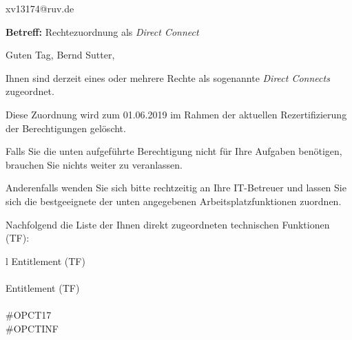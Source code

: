 \documentclass[a4paper,landscape,12pt]{letter}
\begin{document}
\begin{letter}{xv13174@ruv.de\hfill \break}
\begin{normalsize}
	\opening{\textbf{Betreff:} Rechtezuordnung als \emph{Direct Connect}}
	\begin{normalsize} \hfill
	\end{normalsize}

	\begin{normalsize}
		Guten Tag, 
	Bernd Sutter, \hfill \break
	\end{normalsize}
	\end{normalsize}
	
\begin{normalsize}
	Ihnen sind derzeit eines oder mehrere Rechte als sogenannte \emph{Direct Connects} zugeordnet.
	
	Diese Zuordnung wird zum 01.06.2019 im Rahmen der aktuellen Rezertifizierung der Berechtigungen gelöscht.
	
	Falls Sie die unten aufgeführte Berechtigung nicht für Ihre Aufgaben benötigen, 
	brauchen Sie nichts weiter zu veranlassen.
	
	Anderenfalls wenden Sie sich bitte rechtzeitig an Ihre IT-Betreuer 
	und lassen Sie sich die bestgeeignete der unten angegebenen Arbeitsplatzfunktionen zuordnen.
	\end{normalsize}
	
\begin{normalsize}
	Nachfolgend die Liste der Ihnen direkt zugeordneten technischen Funktionen (TF):

	\begin{longtable}{l}
		Entitlement (TF) \\ \hline
		\endfirsthead
		\\\hline
		Entitlement (TF) \\ \hline
		\endhead %
		\multicolumn{1}{r@{}}{Fortsetzung \ldots}\\
		\endfoot
		\hline
		\endlastfoot
	\#OPCT17\\\#OPCTINF\\
	\end{longtable}
	\end{normalsize}
	

\end{letter}
\end{document}
